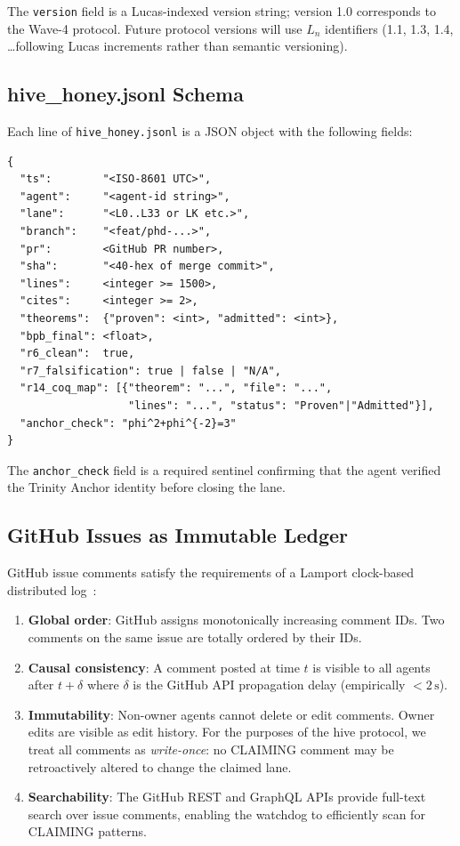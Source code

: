 The \texttt{version} field is a Lucas-indexed version string;
version 1.0 corresponds to the Wave-4 protocol. Future protocol
versions will use $L_n$ identifiers (1.1, 1.3, 1.4, \ldots following
Lucas increments rather than semantic versioning).

\subsection{hive\_honey.jsonl Schema}
\label{ssec:K-honey-schema}

Each line of \texttt{hive\_honey.jsonl} is a JSON object with the
following fields:

\begin{verbatim}
{
  "ts":        "<ISO-8601 UTC>",
  "agent":     "<agent-id string>",
  "lane":      "<L0..L33 or LK etc.>",
  "branch":    "<feat/phd-...>",
  "pr":        <GitHub PR number>,
  "sha":       "<40-hex of merge commit>",
  "lines":     <integer >= 1500>,
  "cites":     <integer >= 2>,
  "theorems":  {"proven": <int>, "admitted": <int>},
  "bpb_final": <float>,
  "r6_clean":  true,
  "r7_falsification": true | false | "N/A",
  "r14_coq_map": [{"theorem": "...", "file": "...",
                   "lines": "...", "status": "Proven"|"Admitted"}],
  "anchor_check": "phi^2+phi^{-2}=3"
}
\end{verbatim}

The \texttt{anchor\_check} field is a required sentinel confirming that
the agent verified the Trinity Anchor identity before closing the lane.

\subsection{GitHub Issues as Immutable Ledger}
\label{ssec:K-github-ledger}

GitHub issue comments satisfy the requirements of a Lamport
clock-based distributed log~\cite{lamport_time_clocks}:
\begin{enumerate}
  \item \textbf{Global order}: GitHub assigns monotonically increasing
    comment IDs. Two comments on the same issue are totally ordered by
    their IDs.
  \item \textbf{Causal consistency}: A comment posted at time $t$ is
    visible to all agents after $t + \delta$ where $\delta$ is the
    GitHub API propagation delay (empirically $< 2\,\text{s}$).
  \item \textbf{Immutability}: Non-owner agents cannot delete or edit
    comments. Owner edits are visible as edit history. For the
    purposes of the hive protocol, we treat all comments as
    \emph{write-once}: no CLAIMING comment may be retroactively
    altered to change the claimed lane.
  \item \textbf{Searchability}: The GitHub REST and GraphQL APIs
    provide full-text search over issue comments, enabling the watchdog
    to efficiently scan for CLAIMING patterns.
\end{enumerate}

